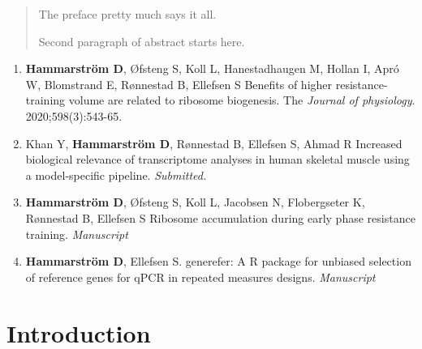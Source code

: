 \documentclass[twoside,10pt]{gihclass} %
\def\labelenumi{\Roman{enumi}.}
\begin{document}
  \begin{abstract}
    The preface pretty much says it all.
    
    \par
    
    Second paragraph of abstract starts here.
  \end{abstract}
  \begin{listofpapers}
    \begin{enumerate}
    \def\labelenumi{\Roman{enumi}.}
    \item
      \textbf{Hammarström D}, Øfsteng S, Koll L, Hanestadhaugen M, Hollan I, Apró W, Blomstrand E, Rønnestad B, Ellefsen S Benefits of higher resistance-training volume are related to ribosome biogenesis. The \emph{Journal of physiology}. 2020;598(3):543-65.
    \item
      Khan Y, \textbf{Hammarström D}, Rønnestad B, Ellefsen S, Ahmad R Increased biological relevance of transcriptome analyses in human skeletal muscle using a model-specific pipeline. \emph{Submitted.}
    \item
      \textbf{Hammarström D}, Øfsteng S, Koll L, Jacobsen N, Flobergseter K, Rønnestad B, Ellefsen S Ribosome accumulation during early phase resistance training. \emph{Manuscript}
    \item
      \textbf{Hammarström D}, Ellefsen S. generefer: A R package for unbiased selection of reference genes for qPCR in repeated measures designs. \emph{Manuscript}
    \end{enumerate}
  \end{listofpapers}

  \hypersetup{linkcolor=black}
  \setcounter{tocdepth}{2}
  \tableofcontents

  \listoftables

  \listoffigures




\mainmatter %
\pagestyle{fancyplain} %

\hypertarget{introduction}{%
\chapter{Introduction}\label{introduction}}
\end{document}
